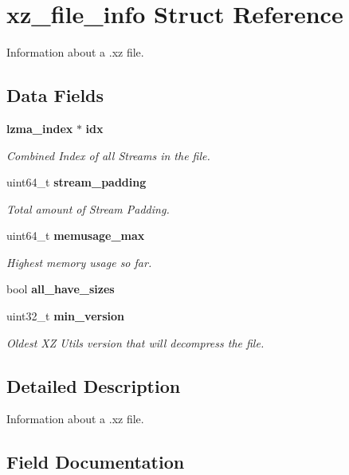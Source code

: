 \section{xz\+\_\+file\+\_\+info Struct Reference}
\label{structxz__file__info}


Information about a .xz file.  


\subsection*{Data Fields}
\begin{DoxyCompactItemize}
\item 
\textbf{ lzma\+\_\+index} $\ast$ \textbf{ idx}
\begin{DoxyCompactList}\small\item\em Combined Index of all Streams in the file. \end{DoxyCompactList}\item 
uint64\+\_\+t \textbf{ stream\+\_\+padding}
\begin{DoxyCompactList}\small\item\em Total amount of Stream Padding. \end{DoxyCompactList}\item 
uint64\+\_\+t \textbf{ memusage\+\_\+max}
\begin{DoxyCompactList}\small\item\em Highest memory usage so far. \end{DoxyCompactList}\item 
bool \textbf{ all\+\_\+have\+\_\+sizes}
\item 
uint32\+\_\+t \textbf{ min\+\_\+version}
\begin{DoxyCompactList}\small\item\em Oldest XZ Utils version that will decompress the file. \end{DoxyCompactList}\end{DoxyCompactItemize}


\subsection{Detailed Description}
Information about a .xz file. 

\subsection{Field Documentation}
\mbox{\label{structxz__file__info_a76baee4f8b030ed51e82f52a3eab7b82}} 
